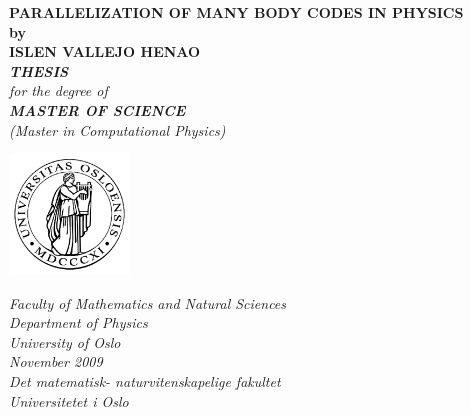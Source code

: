\thispagestyle{empty}
\begin{center}        %
  \vspace{5mm}          %
  \LARGE
  \textbf{PARALLELIZATION OF MANY BODY CODES IN PHYSICS} \\
  \Large
  \vspace{5mm}
  \textbf{by} \\
  \vspace{5mm}
  \large
  \textbf{ISLEN VALLEJO HENAO} \\
  \vspace{30mm} 
  \Large
  {\bf{\textsl{THESIS}}} \\
  \textsl{for the degree of} \\
  \vspace{2mm}
  {\bf{\textsl{MASTER OF SCIENCE}}} \\
  \vspace{5mm}
  {\large \textsl {(Master in Computational Physics)}}\\
  \vspace{10mm}
  \centerline{
\includegraphics[width=32mm,height=32mm]{frontmatter/frontpage/logos/uiologo}}
  \vspace{5mm}
  \index{\footnote{}}%
  \textsl{Faculty of Mathematics and Natural Sciences} \\
  \textsl{Department of Physics} \\
  \textsl{University of Oslo} \\
  \vspace{10mm}
  \large
  \textsl{November 2009} \\
  \vspace{5mm}
  \normalsize
  \textsl{Det matematisk- naturvitenskapelige fakultet} \\
  \textsl{Universitetet i Oslo} \\
\end{center}
\thispagestyle{empty}
